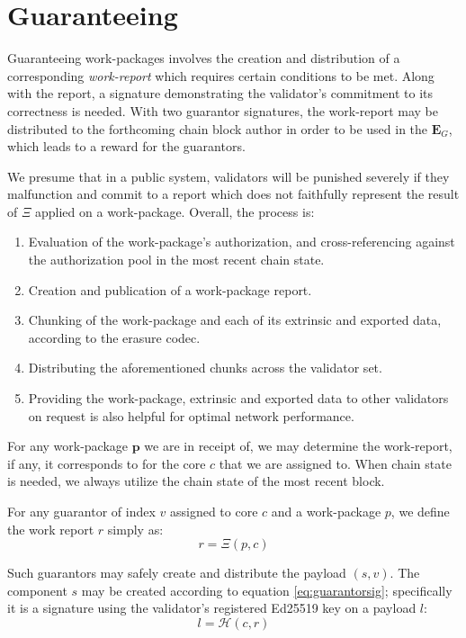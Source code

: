 \section{Guaranteeing}\label{sec:guaranteeing}

Guaranteeing work-packages involves the creation and distribution of a corresponding \emph{work-report} which requires certain conditions to be met. Along with the report, a signature demonstrating the validator's commitment to its correctness is needed. With two guarantor signatures, the work-report may be distributed to the forthcoming \Jam chain block author in order to be used in the $\mathbf{E}_G$, which leads to a reward for the guarantors.

We presume that in a public system, validators will be punished severely if they malfunction and commit to a report which does not faithfully represent the result of $\Xi$ applied on a work-package. Overall, the process is:

\begin{enumerate}
    \item Evaluation of the work-package's authorization, and cross-referencing against the authorization pool in the most recent \Jam chain state.
    \item Creation and publication of a work-package report.
    \item Chunking of the work-package and each of its extrinsic and exported data, according to the erasure codec.
    \item Distributing the aforementioned chunks across the validator set.
    \item Providing the work-package, extrinsic and exported data to other validators on request is also helpful for optimal network performance.
\end{enumerate}

For any work-package $\mathbf{p}$ we are in receipt of, we may determine the work-report, if any, it corresponds to for the core $c$ that we are assigned to. When \Jam chain state is needed, we always utilize the chain state of the most recent block.

For any guarantor of index $v$ assigned to core $c$ and a work-package $p$, we define the work report $r$ simply as:
\begin{equation}
  r = \Xi(p, c)
\end{equation}

Such guarantors may safely create and distribute the payload $(s, v)$. The component $s$ may be created according to equation \ref{eq:guarantorsig}; specifically it is a signature using the validator's registered Ed25519 key on a payload $l$:
\begin{equation}
  l = \mathcal{H}(c, r)
\end{equation}

